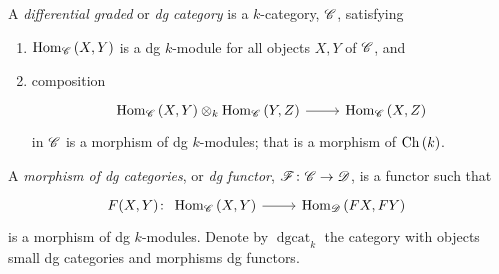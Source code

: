 \documentclass[dissertation.tex]{subfiles}
\begin{document}
        \begin{defn}
          A {\it differential graded} or {\it dg category} is a $k$-category, $\mathscr{C}$, satisfying
          \begin{enumerate}
          \item
            $\operatorname{Hom}_{\mathscr{C}}\left(X,Y\right)$ is a dg $k$-module for all objects $X,Y$ of $\mathscr{C}$, and
          \item
            composition 
            $$\begin{tikzcd}
              \Hom{\CC}{X,Y} \otimes_k \Hom{\CC}{Y,Z} \arrow{r} & \Hom{\CC}{X,Z}
            \end{tikzcd}$$
            in $\mathscr{C}$ is a morphism of dg $k$-modules;
            that is a morphism of $\operatorname{Ch}\left(k\right)$.
          \end{enumerate}
          
          A {\it morphism of dg categories}, or {\it dg functor}, $\mathscr{F} \colon \mathscr{C} \rightarrow \mathscr{D}$, is a functor such that
          $$F(X,Y) \colon 
          \begin{tikzcd}
            \Hom{\CC}{X,Y} \arrow{r} & \Hom{\D}{FX,FY}
          \end{tikzcd}$$
          is a morphism of dg $k$-modules.
          Denote by $\operatorname{dgcat}_k$ the category with objects small dg categories and morphisms dg functors.
        \end{defn}
\end{document}
